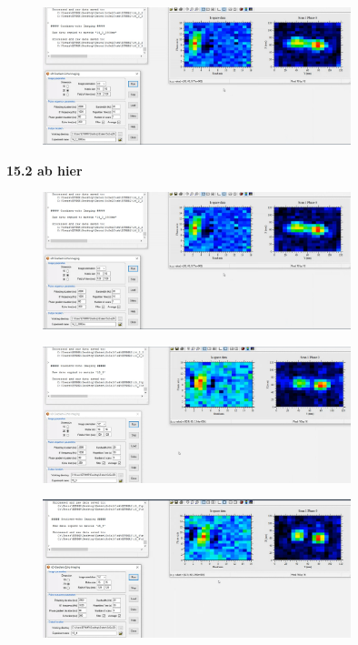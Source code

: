 \begin{figure}[H]
    \centering
    \includegraphics[width = 0.8\textwidth]{Screenshot2/14_2_2800ms.jpg}
\end{figure}

\textbf{15.2 ab hier}
\begin{figure}[H]
    \centering
    \includegraphics[width = 0.8\textwidth]{Screenshot2/14_2_2800ms.jpg}
\end{figure}

\begin{figure}[H]
    \centering
    \includegraphics[width = 0.8\textwidth]{Screenshot2/15_3.jpg}
\end{figure}

\begin{figure}[H]
    \centering
    \includegraphics[width = 0.8\textwidth]{Screenshot2/15_4.jpg}
\end{figure}


